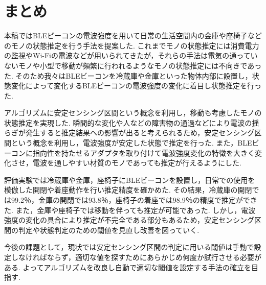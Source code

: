 \documentclass[Japanese]{dicomopapers}
\begin{document}
\section{まとめ}
本稿ではBLEビーコンの電波強度を用いて日常の生活空間内の金庫や座椅子などのモノの状態推定を行う手法を提案した.
これまでモノの状態推定には消費電力の監視やWi-Fiの電波などが用いられてきたが，それらの手法は電気の通っていないモノや小型で移動が頻繁に行われるようなモノの状態推定には不向きであった.
そのため我々はBLEビーコンを冷蔵庫や金庫といった物体内部に設置し，状態変化によって変化するBLEビーコンの電波強度の変化に着目し状態推定を行った.

アルゴリズムに安定センシング区間という概念を利用し，移動も考慮したモノの状態推定を実現した.
瞬間的な変化や人などの障害物の通過などにより電波の揺らぎが発生すると推定結果への影響が出ると考えられるため，安定センシング区間という概念を利用し，電波強度が安定した状態で推定を行った.
また，BLEビーコンに指向性を持たせるアダプタを取り付けて電波強度変化の特徴を大きく変化させ，電波を通しやすい材質のモノであっても推定が行えるようにした.

評価実験では冷蔵庫や金庫，座椅子にBLEビーコンを設置し，日常での使用を模倣した開閉や着座動作を行い推定精度を確かめた.
その結果，冷蔵庫の開閉では99.2％，金庫の開閉では93.8％，座椅子の着座では98.9％の精度で推定ができた.
また，金庫や座椅子では移動を伴っても推定が可能であった.
しかし，電波強度の変化の具合により推定が不完全である部分もあるため，安定センシング区間の判定や状態判定のための閾値を見直し改善を図っていく.

今後の課題として，現状では安定センシング区間の判定に用いる閾値は手動で設定しなければならず，適切な値を探すためにあらかじめ何度か試行させる必要がある.
よってアルゴリズムを改良し自動で適切な閾値を設定する手法の確立を目指す.


\end{document}
